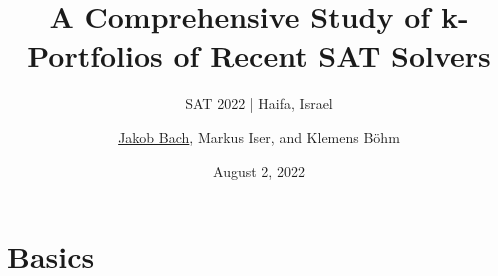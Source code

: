 \documentclass[en]{sdqbeamer}
\title[A Comprehensive Study of k-Portfolios of Recent SAT Solvers]{A Comprehensive Study of k-Portfolios of Recent SAT Solvers} %
\subtitle{SAT 2022 | Haifa, Israel}
\author[\underline{Jakob Bach}, Markus Iser, and Klemens Böhm]{\underline{Jakob Bach}, Markus Iser, and Klemens Böhm} %
\date[2022-08-02]{August 2, 2022} %
\DeclareMathOperator*{\argmin}{arg\,min}
\begin{document}
\KITtitleframe

\section{Basics}

\end{document}
